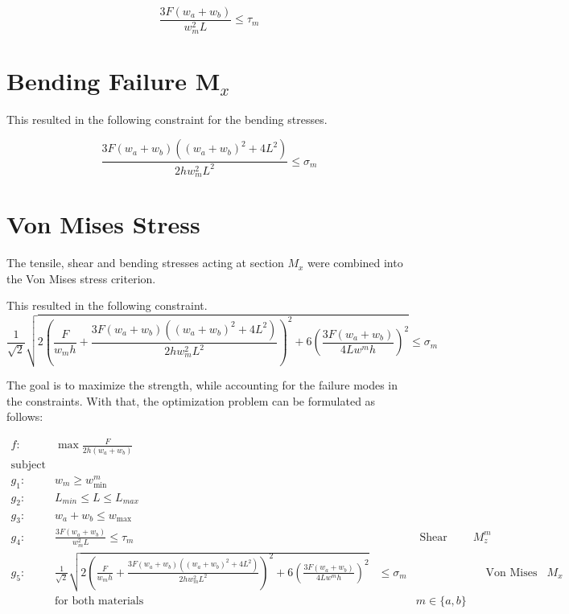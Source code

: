 \begin{equation}
	\frac{ 3 F \left(w_a + w_b \right) }{ w_m ^2 L} \le \tau_m	
\end{equation}


\section{Bending Failure M$_x$}

This resulted in the following constraint for the bending stresses.

\begin{equation}
	\frac{ 3 F \left(w_a + w_b \right) \left(\left(w_a + w_b \right) ^2 + 4L^2 \right)  }{ 2h w_m^2 L^2 }  \le \sigma_m
\end{equation}

\section{Von Mises Stress}
The tensile, shear and bending stresses acting at section $M_x$ were combined into the Von Mises stress criterion.

This resulted in the following constraint.
\begin{equation}
	\frac{1}{\sqrt{2}} \sqrt{2 \left( \frac{ F }{ w_m h}   + \frac{ 3 F \left(w_a + w_b \right) \left(\left(w_a + w_b \right) ^2 + 4 L^2 \right)  }{ 2h w_m^2 L^2} \right)^2 + 6 \left(\frac{ 3 F \left(w_a + w_b \right) }{ 4 L w^m h} \right)^2 }		\le 	\sigma_m
	
\end{equation}



The goal is to maximize the strength, while accounting for the failure modes in the constraints.
With that, the optimization problem can be formulated as follows:

\begin{align}
	f: & \max \frac{F}{2h \left(w_a + w_b\right)} \nonumber \\
	\text{subject to:} & \nonumber \\
	g_1: & w_m \ge w_\text{min}^m \\
	g_2: & L_{min} \le L \le L_{max} \\
	g_3: & w_a + w_b \le w_\text{max} \\
	g_4: & \frac{ 3 F \left(w_a + w_b \right) }{ w_m ^2 L} \le \tau_m						&&\text{ Shear failure } M_z^m \\
	g_5:& \frac{1}{\sqrt{2}} \sqrt{2 \left( \frac{ F }{ w_m h}   + \frac{ 3 F \left(w_a + w_b \right) \left(\left(w_a + w_b \right) ^2 + 4 L^2 \right)  }{ 2h w_m^2 L^2} \right)^2 + 6 \left(\frac{ 3 F \left(w_a + w_b \right) }{ 4 L w^m h} \right)^2 }	& 	\le 	\sigma_m	&&\text{ Von Mises criterion } M_x \\
	& \text{for both materials } && m \in \{a, b\} \nonumber 
\end{align}

